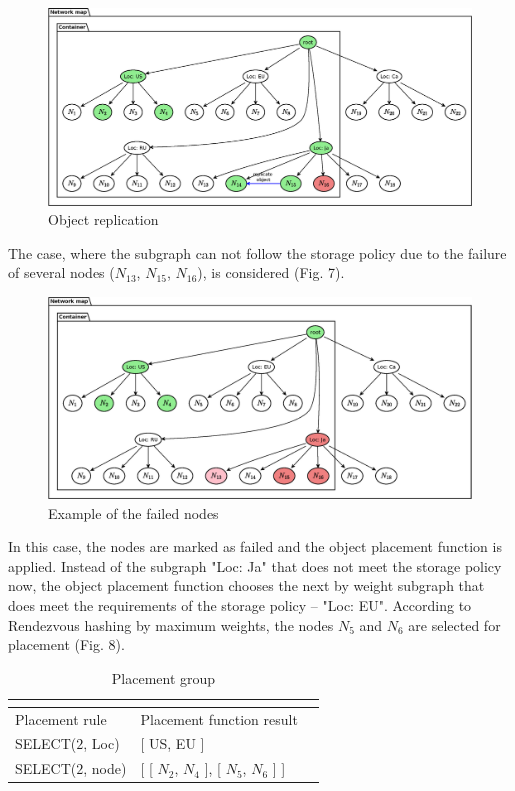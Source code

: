 \documentclass[a4paper, 11pt]{article}
\begin{document}
\begin{figure}[!h]
\centering
\includegraphics[scale=.5]{pic/uml_9_rebalance_2.eps}
\caption{ Object replication }
\end{figure}

\FloatBarrier 

The case, where the subgraph can not follow the storage policy due to
the failure of several nodes ($N_{13}$, $N_{15}$, $N_{16}$), is considered (Fig. 7).

\FloatBarrier 
\begin{figure}[!h]
\centering
\includegraphics[scale=.5]{pic/uml_9_rebalance_3.eps}
\caption{ Example of the failed nodes }
\end{figure}
\FloatBarrier 

In this case, the nodes are marked as failed and the object placement function
is applied. Instead of the subgraph "Loc: Ja" that does not meet the
storage policy now, the object placement function chooses the next by weight
subgraph that does meet the requirements of the storage policy -- "Loc: EU".
According to Rendezvous hashing by maximum weights, the nodes $N_5$ and $N_6$
are selected for placement (Fig. 8).

\FloatBarrier 

\begin{table}[!htbp]
\begin{scriptsize}
\begin{tabular}{@{}|l|l|l|@{}}
\multicolumn{2}{l}{}                           \\ \midrule
Placement rule & Placement function result            \\ \midrule
SELECT($2$, Loc) &  [ US, EU ] \\ \midrule
SELECT($2$, node) & \parbox{6cm}{ [ [ $N_2$, $N_4$ ], [ $N_{5}$, $N_{6}$ ] ] } \\ \bottomrule
\end{tabular}
\end{scriptsize}
\caption{Placement group}
\end{table}
\FloatBarrier 
\end{document}
